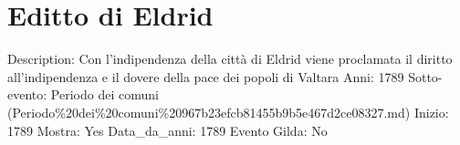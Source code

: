 \section{Editto di Eldrid}\label{editto-di-eldrid}

Description: Con l'indipendenza della città di Eldrid viene proclamata
il diritto all'indipendenza e il dovere della pace dei popoli di Valtara
Anni: 1789 Sotto-evento: Periodo dei comuni
(Periodo\%20dei\%20comuni\%20967b23efcb81455b9b5e467d2ce08327.md)
Inizio: 1789 Mostra: Yes Data\_da\_anni: 1789 Evento Gilda: No
